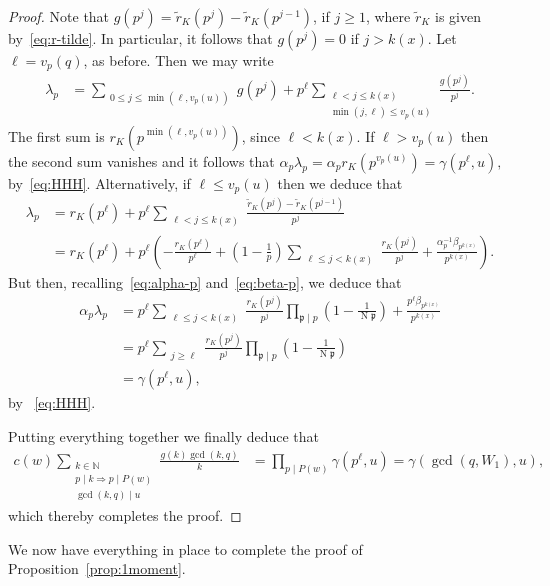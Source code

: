 \documentclass[11pt,letterpaper]{amsart}
\renewcommand{\leq}{\leqslant}
\renewcommand{\geq}{\geqslant}
\theoremstyle{definition}
\numberwithin{equation}{section}
\newcommand\NN{\mathbb{N}}
\DeclareMathOperator{\n}{N}
\newcommand{\fp}{\mathfrak{p}}
\newcommand{\0}{\mathbf{0}}
\begin{document}
\begin{proof}
Note that   $g(p^j)=\tilde r_K(p^j)-\tilde r_K(p^{j-1})$, if $j\geq 1$, where
$\tilde r_K$ is given by~\eqref{eq:r-tilde}. In particular, it follows that $g(p^j)=0$ if $j>k(x)$.  
Let $\ell=v_p(q)$, as before. Then  we may write
\begin{align*}
\lambda_p
&=
\sum_{
\substack{
0\leq j\leq \min(\ell, v_p(u))
}}g(p^j) + 
p^{\ell}
\sum_{
\substack{
\ell<j\leq k(x) \\
\min(j,\ell)\leq v_p(u)
}}\frac{g(p^j)}{p^j}.
\end{align*}
The first sum is  $r_K(p^{\min(\ell, v_p(u))})$, since $\ell<k(x)$. 
If $\ell>v_p(u)$ then the second sum vanishes and it follows that 
$
\alpha_p\lambda_p=\alpha_p r_K(p^{v_p(u)})=\gamma(p^\ell,u),
$
by~\eqref{eq:HHH}.
Alternatively, if  $\ell\leq v_p(u)$ then we deduce that 
\begin{align*}
\lambda_p
&=r_K(p^\ell) +
p^{\ell}\sum_{
\substack{\ell<j\leq k(x)}}
\frac{\tilde r_K(p^j)-\tilde r_K(p^{j-1})}{p^j}
\\
&=r_K(p^\ell)+p^\ell\left(-\frac{r_K(p^{\ell})}{p^\ell}+
\left(1-\frac{1}{p}\right)\sum_{
\substack{\ell\leq j< k(x)}}
\frac{r_K(p^j)}{p^j} +\frac{\alpha_p^{-1}\beta_{p^{k(x)}}}{p^{k(x)}}\right).
\end{align*}
But then, recalling~\eqref{eq:alpha-p} and~\eqref{eq:beta-p}, we deduce that
\begin{align*}
\alpha_p\lambda_p
&=
p^\ell\sum_{
\substack{\ell\leq j< k(x)}}
\frac{r_K(p^j)}{p^j} 
\prod_{\fp\mid p}\left(1-\frac{1}{\n\fp}\right)
+\frac{p^\ell\beta_{p^{k(x)}}}{p^{k(x)}}\\
&=
p^\ell\sum_{
\substack{j\geq \ell}}
\frac{r_K(p^j)}{p^j} 
\prod_{\fp\mid p}\left(1-\frac{1}{\n\fp}\right)\\
&=\gamma(p^\ell,u),
\end{align*}
by ~\eqref{eq:HHH}.

Putting everything together we finally deduce that 
\begin{align*}
c(w)
\sum_{\substack{k\in \NN\\ 
p\mid k \Rightarrow p\mid P(w)
\\ \gcd(k,q)\mid u}} \frac{g(k)\gcd(k,q) }{k}
&= 
\prod_{p\mid P(w)} \gamma(p^\ell,u) 
= 
 \gamma(\gcd(q,W_1),u),
\end{align*}
which thereby completes the proof.
\end{proof}

We now have everything in place to complete the proof of Proposition~\ref{prop:1moment}.
\end{document}
